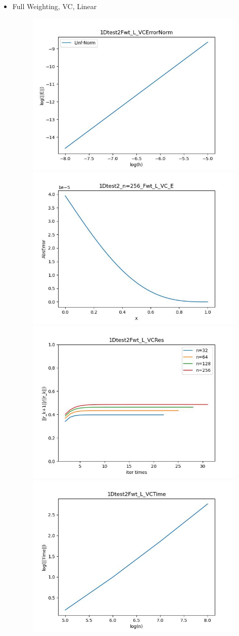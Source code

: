 \documentclass{article}
\begin{document}
\begin{itemize}
    \item Full Weighting, VC, Linear
    \begin{figure}[h]
        \centering
        \includegraphics[width=0.35\linewidth]{1Dtest2Fwt_L_VCErrorNorm.jpg}
        \includegraphics[width=0.35\linewidth]{1Dtest2_n=256_Fwt_L_VC_E.jpg}
        \includegraphics[width=0.35\linewidth]{1Dtest2Fwt_L_VCRes.jpg}
        \includegraphics[width=0.35\linewidth]{1Dtest2Fwt_L_VCTime.jpg}
    \end{figure}
    

\end{itemize}
\end{document}
